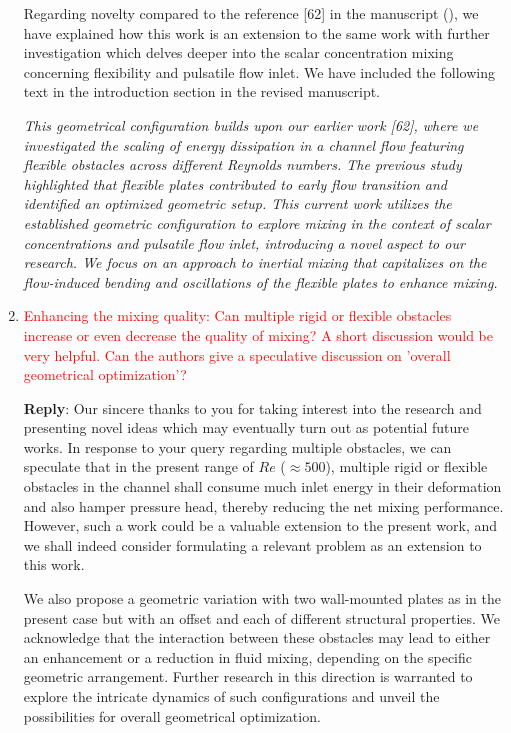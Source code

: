 \documentclass[onecolumn,a4paper,amsmath,amssym,pre]{revtex4}
\begin{document}
\begin{enumerate}
					Regarding novelty compared to the reference [62] in the manuscript (\cite{Self2019}), we have explained how this work is an extension to the same work with further investigation which delves deeper into the scalar concentration mixing concerning flexibility and pulsatile flow inlet. We have included the following text in the introduction section in the revised manuscript.
					
					\textit{This geometrical configuration builds upon our earlier work [62], where we investigated the scaling of energy dissipation in a channel flow featuring flexible obstacles across different Reynolds numbers. The previous study highlighted that flexible plates contributed to early flow transition and identified an optimized geometric setup. This current work utilizes the established geometric configuration to explore mixing in the context of scalar concentrations and pulsatile flow inlet, introducing a novel aspect to our research. We focus on an approach to inertial mixing that capitalizes on the flow-induced bending and oscillations of the flexible plates to enhance mixing.}
					
					\item \textcolor{red}{Enhancing the mixing quality:	Can multiple rigid or flexible obstacles increase or even decrease the quality of mixing? A short discussion would be very helpful. Can the authors give a speculative discussion on 'overall geometrical optimization'?}
					
					\textbf{Reply}: Our sincere thanks to you for taking interest into the research and presenting novel ideas which may eventually turn out as potential future works. In response to your query regarding multiple obstacles, we can speculate that in the present range of $Re$ ($\approx500$), multiple rigid or flexible obstacles in the channel shall consume much inlet energy in their deformation and also hamper pressure head, thereby reducing the net mixing performance. However, such a work could be a valuable extension to the present work, and we shall indeed consider formulating a relevant problem as an extension to this work.
					
					We also propose a geometric variation with two wall-mounted plates as in the present case but with an offset and each of different structural properties. We acknowledge that the interaction between these obstacles may lead to either an enhancement or a reduction in fluid mixing, depending on the specific geometric arrangement. Further research in this direction is warranted to explore the intricate dynamics of such configurations and unveil the possibilities for overall geometrical optimization.
					

\end{enumerate}
\end{document}
